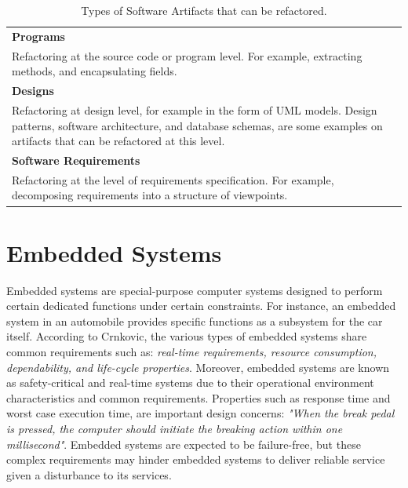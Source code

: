 \begin{table}[ht!]
	\renewcommand{\arraystretch}{1.2}
	\centering	
	\begin{tabular}{p{}} \hline
		\textbf{Programs} \\Refactoring at the source code or program level. For example, extracting methods, and encapsulating fields. \\ \hline
		\textbf{Designs} \\
		Refactoring at design level, for example in the form of UML models. Design patterns, software architecture, and database schemas, are some examples on artifacts that can be refactored at this level. \\ \hline
		\textbf{Software Requirements} \\
		Refactoring at the level of requirements specification. For example, decomposing requirements into a structure of viewpoints. \\ \hline
	\end{tabular}
	\caption{Types of Software Artifacts that can be refactored.}
	\label{tab:refactorArtifacts}
\end{table}





			

\section{Embedded Systems}
\label{sec:2-ES}
Embedded systems are special-purpose computer systems designed to perform certain dedicated functions under certain constraints. For instance, an embedded system in an automobile provides specific functions as a subsystem for the car itself\cite{Crnkovic:2005:CSE:1062455.1062631}. According to Crnkovic\cite{crnkovic2004component}, the various types of embedded systems share common requirements such as: \textit{real-time requirements, resource consumption, dependability, and life-cycle properties}. Moreover, embedded systems are known as safety-critical and real-time systems due to their operational environment characteristics and common requirements\cite{563572,Crnkovic:2005:CSE:1062455.1062631}. Properties such as response time and worst case execution time, are important design concerns\cite{4519555}: \textit{"When the break pedal is pressed, the computer should initiate the breaking action within one millisecond"}. Embedded systems are expected to be failure-free\cite{you2013reliability}, but these complex requirements may hinder embedded systems to deliver reliable service given a disturbance to its services\cite{patil2009embedded}. 

